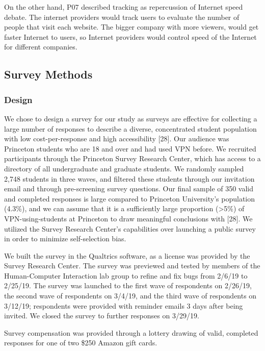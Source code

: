 On the other hand, P07 described tracking as repercussion of Internet speed
debate. The internet providers would track users to evaluate the number of
people that visit each website. The bigger company with more viewers, would
get faster Internet to users, so Internet providers would control speed of the
Internet for different companies. 





\subsection{Survey Methods} \subsubsection{Design}

We chose to design a survey for our study as surveys are effective for
collecting a large number of responses to describe a diverse, concentrated
student population with low cost-per-response and high accessibility [28]. Our
audience was Princeton students who are 18 and over and had used VPN before.
We recruited participants through the Princeton Survey Research Center, which
has access to a directory of all undergraduate and graduate students. We
randomly sampled 2,748 students in three waves, and filtered these students
through our invitation email and through pre-screening survey questions. Our
final sample of 350 valid and completed responses is large compared to
Princeton University's population (4.3\%), and we can assume that it is a
sufficiently large proportion (>5\%) of VPN-using-students at Princeton to
draw meaningful conclusions with [28]. We utilized the Survey Research
Center's capabilities over launching a public survey in order to minimize
self-selection bias.

We built the survey in the Qualtrics software, as a license was provided by
the Survey Research Center. The survey was previewed and tested by members of
the Human-Computer Interaction lab group to refine and fix bugs from 2/6/19 to
2/25/19. The survey was launched to the first wave of respondents on 2/26/19,
the second wave of respondents on 3/4/19, and the third wave of respondents on
3/12/19; respondents were provided with reminder emails 3 days after being
invited. We closed the survey to further responses on 3/29/19.

Survey compensation was provided through a lottery drawing of valid, completed
responses for one of two \$250 Amazon gift cards.

